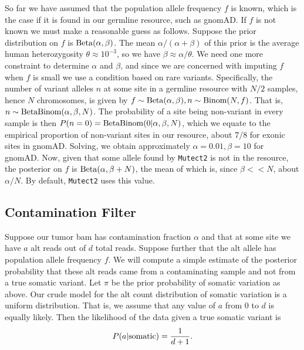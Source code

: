 \documentclass[nofootinbib,amssymb,amsmath]{revtex4}
\newcommand{\code}[1]{\texttt{#1}}
\begin{document}
So far we have assumed that the population allele frequency $f$ is known, which is the case if it is found in our germline resource, such as gnomAD.  If $f$ is not known we must make a reasonable guess as follows.  Suppose the prior distribution on $f$ is ${\rm Beta}(\alpha, \beta)$.  The mean $\alpha/(\alpha +\beta)$ of this prior is the average human heterozygosity $\theta \approx 10^{-3}$, so we have $\beta \approx \alpha / \theta$.  We need one more constraint to determine $\alpha$ and $\beta$, and since we are concerned with imputing $f$ when $f$ is small we use a condition based on rare variants.  Specifically, the number of variant alleles $n$ at some site in a germline resource with $N/2$ samples, hence $N$ chromosomes, is given by $f \sim {\rm Beta}(\alpha, \beta), n \sim {\rm Binom}(N,f)$.  That is, $n \sim {\rm BetaBinom}(\alpha, \beta, N)$.  The probability of a site being non-variant in every sample is then $P(n = 0) = {\rm BetaBinom}(0 | \alpha, \beta, N)$, which we equate to the empirical proportion of non-variant sites in our resource, about $7/8$ for exonic sites in gnomAD.  Solving, we obtain approximately $\alpha = 0.01, \beta = 10$ for gnomAD.  Now, given that some allele found by \code{Mutect2} is not in the resource, the posterior on $f$ is ${\rm Beta}(\alpha, \beta + N)$, the mean of which is, since $\beta << N$, about $\alpha / N$.  By default, \code{Mutect2} uses this value.

\subsection{Contamination Filter}\label{contamination-filter}
Suppose our tumor bam has contamination fraction $\alpha$ and that at some site we have $a$ alt reads out of $d$ total reads.  Suppose further that the alt allele has population allele frequency $f$.  We will compute a simple estimate of the posterior probability that these alt reads came from a contaminating sample and not from a true somatic variant.  Let $\pi$ be the prior probability of somatic variation as above.  Our crude model for the alt count distribution of somatic variation is a uniform distribution.  That is, we assume that any value of $a$ from $0$ to $d$ is equally likely.  Then the likelihood of the data given a true somatic variant is
\begin{equation}
P(a | {\rm somatic})  = \frac{1}{d + 1}.
\end{equation}
\end{document}
